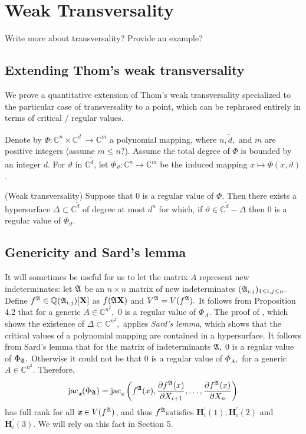 \documentclass[sigconf]{acmart}
\def\xb{\textit{\textbf{x}}}
\def\C{\mathbb{C}}
\def\vt{\vartheta}
\def\jac{ \textrm{jac}}
\def\dt{\widetilde{d}}
\def\pa{\partial}
\def\A{\frak{A}}
\begin{document}
\section{Weak Transversality}
Write more about transversality? Provide an example?
%
%
\subsection{Extending Thom's weak transversality}
%
We prove a quantitative extension of Thom's weak transversality \cite{TWT} specialized to the particular case of transversality to a point, which can be rephrased entirely in terms of critical / regular values.
\par 
Denote by $\Phi :\C^n \times \C^{\dt} ~ \rightarrow \C^{m}$
a polynomial mapping, where $n,\dt,$ and $m$ are positive integers (assume $m \leq n$?). Assume the total degree of $\Phi$ is bounded by an integer $d$. For $\vt$ in $\C^{\dt}$, let $\Phi_{\vt} : \C^n \rightarrow \C^{m}$ be the induced mapping $x\mapsto \Phi(x,\vt)$.
\begin{theorem} (Weak transversality)
Suppose that $0$ is a regular value of $\Phi$. Then there exists a hypersurface $\Delta \subset \C^{\dt}$ of degree at most $d^n$ for which, if $\vt \in \C^{\dt}-\Delta$ then $0$ is a regular value of $\Phi_{\vt}$. 
\end{theorem}
%
%
\subsection{Genericity and Sard's lemma}
It will sometimes be useful for us to let the matrix $A$ represent new indeterminates: let $\A$ be an $n \times n$ matrix of new indeterminates $(\A_{i,j})_{1 \leq i , j \leq n}.$ Define $f^{\A} \in \mathbb{Q}(\A_{i,j})[\textbf{X}]$ as $f(\A\textbf{X})$ and $V^\A=V(f^\A).$ It follows from Proposition 4.2 that for a generic $A \in \C^{n^2},$ $0$ is a regular value of $\Phi_{A}$.  The proof of \cite[Theorem B.3]{NO}, which shows the existence of $\Delta \subset \C^{n^2},$ applies \textit{Sard's lemma}, which shows that the critical values of a polynomial mapping are contained in a hypersurface. It follows from Sard's lemma that for the matrix of indeterminants $\A,$ $0$ is a regular value of $\Phi_{\A}.$ Otherwise it could not be that $0$ is a regular value of $\Phi_A,$ for a generic $A\in \C^{n^2}.$ Therefore,
\[
\jac_{\xb}(\Phi_{\A}) = \jac_{\xb}\left(f^{\A}(x),\frac{\pa f^{\A}(x)}{\pa X_{i+1}},\hdots,\frac{\pa f^{\A}(x)}{\pa X_n}\right)
\]
has full rank for all $\xb \in V(f^{\A})$, and thus $f^{\A}$satisfies $\textbf{H}_i^{'}(1),\textbf{H}_i^{'}(2)$ and $\textbf{H}_i^{'}(3)$. We will rely on this fact in Section 5. 
%
%
\end{document}
